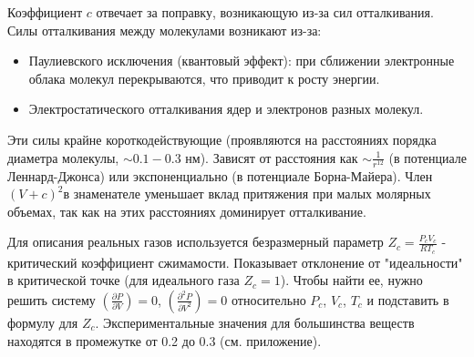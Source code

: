 \documentclass[a4paper]{article}
\numberwithin{equation}{subsection} %
\begin{document}
Коэффициент $c$ отвечает за поправку, возникающую из-за сил отталкивания. Силы отталкивания между молекулами возникают из-за:
\begin{itemize}
\item Паулиевского исключения (квантовый эффект): при сближении электронные облака молекул перекрываются, что приводит к росту энергии.
\item Электростатического отталкивания ядер и электронов разных молекул.
\end{itemize}
Эти силы крайне короткодействующие (проявляются на расстояниях порядка диаметра молекулы, $\sim 0.1-0.3$ нм). Зависят от расстояния как $\sim \frac{1}{r^{12}}$ (в потенциале Леннард-Джонса) или экспоненциально (в потенциале Борна-Майера).
Член $(V+c)^2$в знаменателе уменьшает вклад притяжения при малых молярных объемах, так как на этих расстояниях доминирует отталкивание.

Для описания реальных газов используется безразмерный параметр $Z_c = \frac{P_c V_c}{R T_c}$ - критический коэффициент сжимамости. Показывает отклонение от "идеальности" в критической точке (для идеального газа $Z_c = 1$). Чтобы найти ее, нужно решить систему $\left( \frac{\partial P}{\partial V} \right) = 0$, $\left( \frac{\partial^2 P}{\partial V^2} \right) = 0$ относительно $P_c$, $V_c$, $T_c$ и подставить в формулу для $Z_c$. Экспериментальные значения для большинства веществ находятся в промежутке от 0.2 до 0.3 (см. приложение).
\end{document}
